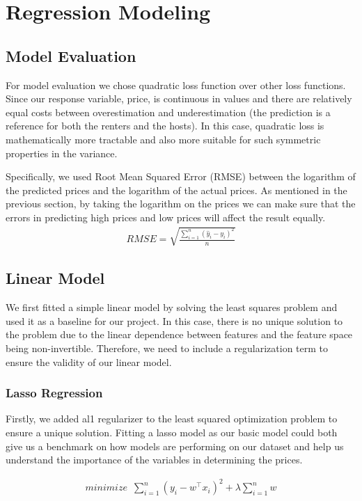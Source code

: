 \documentclass[twocolumn]{article}
\begin{document}
\section{Regression Modeling}
\subsection{Model Evaluation}
For model evaluation we chose quadratic loss function over other loss functions. Since our response variable, price, is continuous in values and there are relatively equal costs between overestimation and underestimation (the prediction is a reference for both the renters and the hosts). In this case, quadratic loss is mathematically more tractable and also more suitable for such symmetric properties in the variance. 

Specifically, we used Root Mean Squared Error (RMSE) between the logarithm of the predicted prices and the logarithm of the actual prices. As mentioned in the previous section, by taking the logarithm on the prices we can make sure that the errors in predicting high prices and low prices will affect the result equally.
\begin{align}  
    \displaystyle{RMSE = \sqrt{\frac {\sum_{i = 1}^{n}(\hat{y}_{i} - y_{i})^2}{n}}}
\end{align}
\subsection{Linear Model}
We first fitted a simple linear model by solving the least squares problem and used it as a baseline for our project. In this case, there is no unique solution to the problem due to the linear dependence between features and the feature space being non-invertible. Therefore, we need to include a regularization term to ensure the validity of our linear model.

\subsubsection{Lasso Regression}
Firstly, we added al1 regularizer to the least squared optimization problem to ensure a unique solution. Fitting a lasso model as our basic model could both give us a benchmark on how models are performing on our dataset and help us understand the importance of the variables in determining the prices. 

\begin{align}  
    \displaystyle{minimize \enspace \sum\limits_{i=1}^{n}(y_i - w^\intercal x_i)^2 + \lambda \sum\limits_{i=1}^{n} w}
\end{align}
\end{document}
